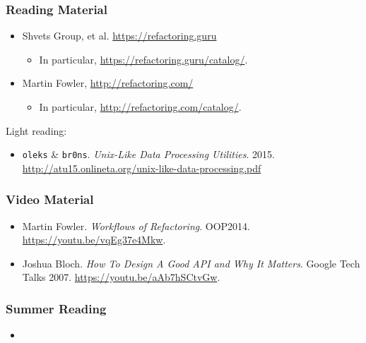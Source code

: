 \begin{frame}

\frametitle{Reading Material}

\footnotesize

\begin{itemize}

\item Shvets Group, et al. \url{https://refactoring.guru}

\begin{itemize}

\item In particular, \url{https://refactoring.guru/catalog/}.

\end{itemize}

\item Martin Fowler, \url{http://refactoring.com/}

\begin{itemize}

\item In particular, \url{http://refactoring.com/catalog/}.

\end{itemize}

\end{itemize}

Light reading:

\begin{itemize}

\item \texttt{oleks} \& \texttt{br0ns}. \emph{Unix-Like Data Processing
Utilities}. 2015. \url{http://atu15.onlineta.org/unix-like-data-processing.pdf}

\end{itemize}

\end{frame}


\begin{frame}

\frametitle{Video Material}

\footnotesize

\begin{itemize}

\item Martin Fowler. \emph{Workflows of Refactoring}. OOP2014.
\url{https://youtu.be/vqEg37e4Mkw}.

\item Joshua Bloch. \emph{How To Design A Good API and Why It Matters}. Google
Tech Talks 2007. \url{https://youtu.be/aAb7hSCtvGw}.

%

\end{itemize}

\end{frame}


\begin{frame}

\frametitle{Summer Reading}

\footnotesize

\begin{itemize}

\item

\end{itemize}

\end{frame}
